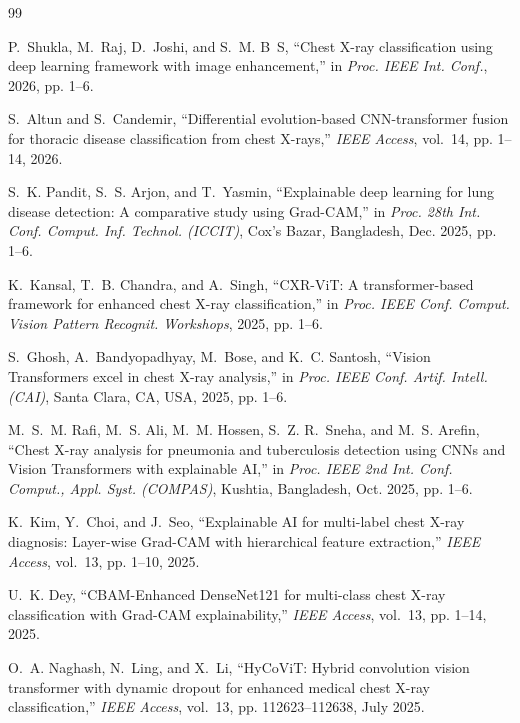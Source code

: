 \documentclass[journal]{IEEEtran}
\begin{document}
\begin{thebibliography}{99}

P.~Shukla, M.~Raj, D.~Joshi, and S.~M. B~S, ``Chest X-ray classification using deep learning framework with image enhancement,'' in \emph{Proc. IEEE Int. Conf.}, 2026, pp. 1--6.

S.~Altun and S.~Candemir, ``Differential evolution-based CNN-transformer fusion for thoracic disease classification from chest X-rays,'' \emph{IEEE Access}, vol.~14, pp. 1--14, 2026.

S.~K. Pandit, S.~S. Arjon, and T.~Yasmin, ``Explainable deep learning for lung disease detection: A comparative study using Grad-CAM,'' in \emph{Proc. 28th Int. Conf. Comput. Inf. Technol. (ICCIT)}, Cox's Bazar, Bangladesh, Dec. 2025, pp. 1--6.

K.~Kansal, T.~B. Chandra, and A.~Singh, ``CXR-ViT: A transformer-based framework for enhanced chest X-ray classification,'' in \emph{Proc. IEEE Conf. Comput. Vision Pattern Recognit. Workshops}, 2025, pp. 1--6.

S.~Ghosh, A.~Bandyopadhyay, M.~Bose, and K.~C. Santosh, ``Vision Transformers excel in chest X-ray analysis,'' in \emph{Proc. IEEE Conf. Artif. Intell. (CAI)}, Santa Clara, CA, USA, 2025, pp. 1--6.

M.~S.~M. Rafi, M.~S. Ali, M.~M. Hossen, S.~Z. R.~Sneha, and M.~S. Arefin, ``Chest X-ray analysis for pneumonia and tuberculosis detection using CNNs and Vision Transformers with explainable AI,'' in \emph{Proc. IEEE 2nd Int. Conf. Comput., Appl. Syst. (COMPAS)}, Kushtia, Bangladesh, Oct. 2025, pp. 1--6.

K.~Kim, Y.~Choi, and J.~Seo, ``Explainable AI for multi-label chest X-ray diagnosis: Layer-wise Grad-CAM with hierarchical feature extraction,'' \emph{IEEE Access}, vol.~13, pp. 1--10, 2025.

U.~K. Dey, ``CBAM-Enhanced DenseNet121 for multi-class chest X-ray classification with Grad-CAM explainability,'' \emph{IEEE Access}, vol.~13, pp. 1--14, 2025.

O.~A. Naghash, N.~Ling, and X.~Li, ``HyCoViT: Hybrid convolution vision transformer with dynamic dropout for enhanced medical chest X-ray classification,'' \emph{IEEE Access}, vol.~13, pp. 112623--112638, July 2025.


\end{thebibliography}
\end{document}
